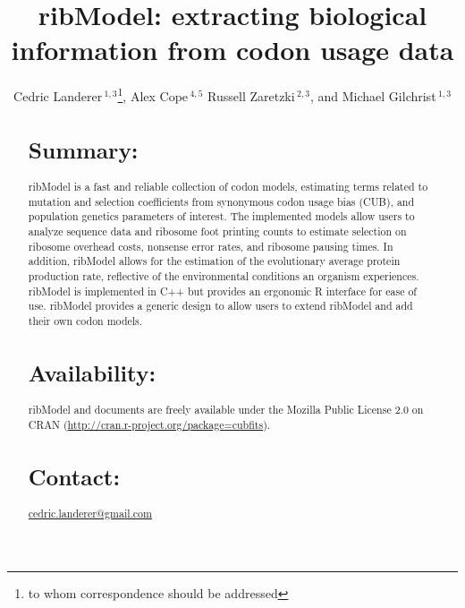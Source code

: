 \documentclass{bioinfo}
\newcommand{\pkg}[1]{{\fontseries{b}\selectfont #1}}
\newcommand{\package}{ribModel } %
\begin{document}

\title[ribModel]{ribModel: extracting biological information from codon usage data}
\author[
Landerer \textit{et~al}]{Cedric Landerer\,$^{1,3}$\footnote{
to whom correspondence should be addressed
},
Alex Cope\,$^{4,5}$
Russell Zaretzki\,$^{2,3}$, and
Michael Gilchrist\,$^{1,3}$
}
\address{$^{1}$
Department of Ecology and Evolutionary Biology,
$^{2}$Department of Statistics, Operations, and Management Science, and
$^{3}$National Institute for Mathematical and Biological Synthesis,
University of Tennessee, Knoxville, TN, USA,
$^{4}$Genome Science and Technology, University of Tennessee, Knoxville, TN, USA
$^{5}$Oak Ridge National Labratory, Oak Ridge, TN, USA} 


\maketitle

\begin{abstract}

\section{Summary:}
\pkg{\package} is a fast and reliable collection of codon models, estimating terms related to mutation and selection coefficients from synonymous codon usage bias (CUB), and population genetics parameters of interest. 
The implemented models allow users to analyze sequence data and ribosome foot printing counts to estimate selection on ribosome overhead costs, nonsense error rates, and ribosome pausing times. 
In addition, \package allows for the estimation of the evolutionary average protein production rate, reflective of the environmental conditions an organism experiences. 
\package is implemented in C++ but provides an ergonomic R interface for ease of use. 
\package provides a generic design to allow users to extend \package and add their own codon models.

\section{Availability:}
\pkg{\package} and documents are freely available under the Mozilla Public License 2.0
on CRAN (\url{http://cran.r-project.org/package=cubfits}).

\section{Contact:} \href{cedric.landerer@gmail.com}{cedric.landerer@gmail.com}
\end{abstract}
\end{document}
